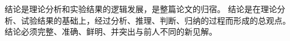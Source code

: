 
%
%
%


结论是理论分析和实验结果的逻辑发展，是整篇论文的归宿。
结论是在理论分析、试验结果的基础上，经过分析、推理、判断、归纳的过程而形成的总观点。
结论必须完整、准确、鲜明、并突出与前人不同的新见解。